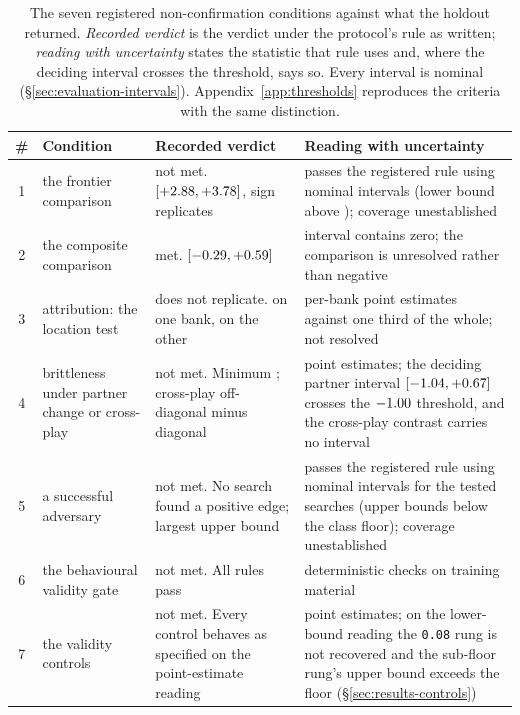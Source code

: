 \begin{table}[!ht]\centering
\caption{The seven registered non-confirmation conditions against what the holdout returned.
\emph{Recorded verdict} is the verdict under the protocol's rule as written; \emph{reading with
uncertainty} states the statistic that rule uses and, where the deciding interval crosses the
threshold, says so. Every interval is nominal (\S\ref{sec:evaluation-intervals}).
Appendix~\ref{app:thresholds} reproduces the criteria with the same distinction.}
\label{tab:seven}
{\tabfont
\begin{tabularx}{\linewidth}{@{}c Q{0.8} Q{1.1} Q{1.1}@{}}
\toprule
\# & Condition & Recorded verdict & Reading with uncertainty \\
 & the frontier comparison & not met. \vsevenBtwoFcheap{} $[+2.88, +3.78]$, sign replicates & passes the registered rule using nominal intervals (lower bound above \vsevenPrimaryFloor{}); coverage unestablished \\
2 & the composite comparison & met. \vsevenBtwoComposite{} $[-0.29, +0.59]$ & interval contains zero; the comparison is unresolved rather than negative \\
3 & attribution: the location test & does not replicate. \vsevenLocVerdictOne{} on one bank, \vsevenLocVerdictThree{} on the other & per-bank point estimates against one third of the whole; not resolved \\
4 & brittleness under partner change or cross-play & not met. Minimum \vsevenSoneMin{}; cross-play off-diagonal minus diagonal \vsevenXpGap{} & point estimates; the deciding partner interval $[-1.04, +0.67]$ crosses the $-1.00{}$ threshold, and the cross-play contrast carries no interval \\
5 & a successful adversary & not met. No search found a positive edge; largest upper bound \vsevenBfourWorstUpper{} & passes the registered rule using nominal intervals for the tested searches (upper bounds below the class floor); coverage unestablished \\
6 & the behavioural validity gate & not met. All \vsevenGateRules{} rules pass & deterministic checks on training material \\
7 & the validity controls & not met. Every control behaves as specified on the point-estimate reading & point estimates; on the lower-bound reading the \texttt{0.08} rung is not recovered and the sub-floor rung's upper bound exceeds the floor (\S\ref{sec:results-controls}) \\
\bottomrule
\end{tabularx}}
\end{table}


